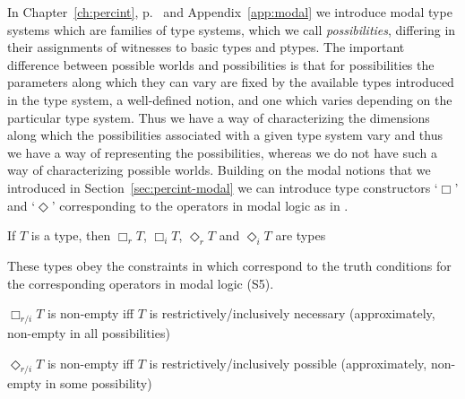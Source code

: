 In Chapter~\ref{ch:percint}, p.~\pageref{pg:modal-systems} and
Appendix~\ref{app:modal} we introduce modal type systems which are
families of type systems, which we call \textit{possibilities}, differing in their assignments of
witnesses to basic types and ptypes.  The important difference between
possible worlds and possibilities is that for possibilities the
parameters along which they can vary are fixed by the available types
introduced in the type system, a well-defined notion, and one which
varies depending on the particular type system.  Thus we have a way of
characterizing the dimensions along which the possibilities associated
with a given type system vary and thus we have a way of representing the
possibilities, whereas we do not have such a way of characterizing
possible worlds.  Building on the modal notions that we introduced in
Section~\ref{sec:percint-modal} we can introduce type constructors `$\Box$' and `$\Diamond$' corresponding to the operators in modal
logic as
in \nexteg{}.
\begin{ex} 
If $T$ is a type, then $\Box_r T$, $\Box_i T$, $\Diamond_r T$ and $\Diamond_i T$ are types 
\end{ex}



These types obey the constraints in \nexteg{} which correspond to the
truth conditions for the corresponding operators in modal logic (S5).
\begin{ex} 
\begin{subex} 
 
\item $\Box_{r/i} T$ is non-empty iff $T$ is restrictively/inclusively
  necessary (approximately, non-empty in all possibilities) 
 
\item $\Diamond_{r/i} T$ is non-empty iff $T$ is
  restrictively/inclusively possible (approximately, non-empty in some possibility) 
 
\end{subex} 
\label{ex:modalconds}   
\end{ex}

